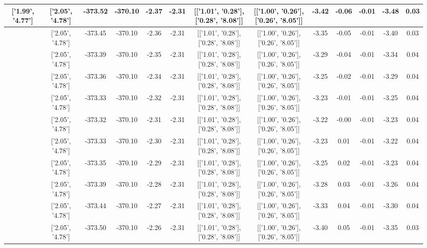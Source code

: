 \begin{table}[htbp]
\begin{adjustbox}{angle=90}
\begin{tabular}{|c|c|c|c|c|c|c|c|c|c|c|c|c|}
 ['1.99', '4.77'] & ['2.05', '4.78'] & -373.52 & -370.10 & -2.37 & -2.31 & [['1.01', '0.28'], ['0.28', '8.08']] & [['1.00', '0.26'], ['0.26', '8.05']] & -3.42 & -0.06 & -0.01 & -3.48 & 0.03\\ \hline
 ['2.00', '4.77'] & ['2.05', '4.78'] & -373.45 & -370.10 & -2.36 & -2.31 & [['1.01', '0.28'], ['0.28', '8.08']] & [['1.00', '0.26'], ['0.26', '8.05']] & -3.35 & -0.05 & -0.01 & -3.40 & 0.03\\ \hline
 ['2.02', '4.78'] & ['2.05', '4.78'] & -373.39 & -370.10 & -2.35 & -2.31 & [['1.01', '0.28'], ['0.28', '8.08']] & [['1.00', '0.26'], ['0.26', '8.05']] & -3.29 & -0.04 & -0.01 & -3.34 & 0.04\\ \hline
 ['2.03', '4.78'] & ['2.05', '4.78'] & -373.36 & -370.10 & -2.34 & -2.31 & [['1.01', '0.28'], ['0.28', '8.08']] & [['1.00', '0.26'], ['0.26', '8.05']] & -3.25 & -0.02 & -0.01 & -3.29 & 0.04\\ \hline
 ['2.04', '4.78'] & ['2.05', '4.78'] & -373.33 & -370.10 & -2.32 & -2.31 & [['1.01', '0.28'], ['0.28', '8.08']] & [['1.00', '0.26'], ['0.26', '8.05']] & -3.23 & -0.01 & -0.01 & -3.25 & 0.04\\ \hline
 ['2.05', '4.78'] & ['2.05', '4.78'] & -373.32 & -370.10 & -2.31 & -2.31 & [['1.01', '0.28'], ['0.28', '8.08']] & [['1.00', '0.26'], ['0.26', '8.05']] & -3.22 & -0.00 & -0.01 & -3.23 & 0.04\\ \hline
 ['2.06', '4.79'] & ['2.05', '4.78'] & -373.33 & -370.10 & -2.30 & -2.31 & [['1.01', '0.28'], ['0.28', '8.08']] & [['1.00', '0.26'], ['0.26', '8.05']] & -3.23 & 0.01 & -0.01 & -3.22 & 0.04\\ \hline
 ['2.07', '4.79'] & ['2.05', '4.78'] & -373.35 & -370.10 & -2.29 & -2.31 & [['1.01', '0.28'], ['0.28', '8.08']] & [['1.00', '0.26'], ['0.26', '8.05']] & -3.25 & 0.02 & -0.01 & -3.23 & 0.04\\ \hline
 ['2.09', '4.79'] & ['2.05', '4.78'] & -373.39 & -370.10 & -2.28 & -2.31 & [['1.01', '0.28'], ['0.28', '8.08']] & [['1.00', '0.26'], ['0.26', '8.05']] & -3.28 & 0.03 & -0.01 & -3.26 & 0.04\\ \hline
 ['2.10', '4.79'] & ['2.05', '4.78'] & -373.44 & -370.10 & -2.27 & -2.31 & [['1.01', '0.28'], ['0.28', '8.08']] & [['1.00', '0.26'], ['0.26', '8.05']] & -3.33 & 0.04 & -0.01 & -3.30 & 0.04\\ \hline
 ['2.11', '4.79'] & ['2.05', '4.78'] & -373.50 & -370.10 & -2.26 & -2.31 & [['1.01', '0.28'], ['0.28', '8.08']] & [['1.00', '0.26'], ['0.26', '8.05']] & -3.40 & 0.05 & -0.01 & -3.35 & 0.03\\ \hline

\end{tabular}
\end{adjustbox}
\end{table}
